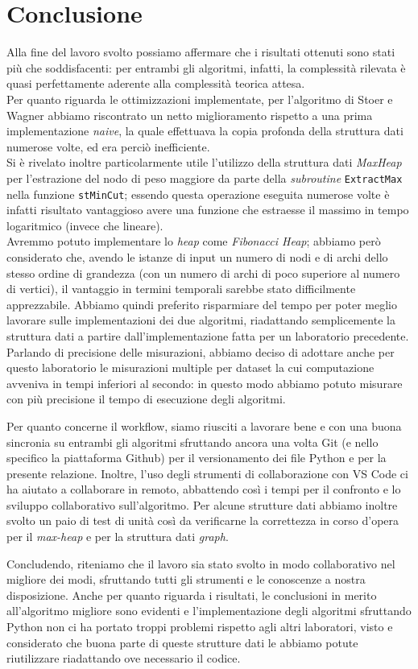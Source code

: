 \section{Conclusione}

Alla fine del lavoro svolto possiamo affermare che i risultati ottenuti sono stati più che soddisfacenti: per entrambi gli algoritmi, infatti, la complessità rilevata è quasi perfettamente aderente alla complessità teorica attesa. \\
Per quanto riguarda le ottimizzazioni implementate, per l'algoritmo di Stoer e Wagner abbiamo riscontrato un netto miglioramento rispetto a una prima implementazione \textit{naive}, la quale effettuava la copia profonda della struttura dati numerose volte, ed era perciò inefficiente.\\
Si è rivelato inoltre particolarmente utile l'utilizzo della struttura dati \textit{MaxHeap} per l'estrazione del nodo di peso maggiore da parte della \textit{subroutine} \texttt{ExtractMax} nella funzione \texttt{stMinCut}; essendo questa operazione eseguita numerose volte è infatti risultato vantaggioso avere una funzione che estraesse il massimo in tempo logaritmico (invece che lineare). \\
Avremmo potuto implementare lo \textit{heap} come \textit{Fibonacci Heap}; abbiamo però considerato che, avendo le istanze di input un numero di nodi e di archi dello stesso ordine di grandezza (con un numero di archi di poco superiore al numero di vertici), il vantaggio in termini temporali sarebbe stato difficilmente apprezzabile. Abbiamo quindi preferito risparmiare del tempo per poter meglio lavorare sulle implementazioni dei due algoritmi, riadattando semplicemente la struttura dati a partire dall'implementazione fatta per un laboratorio precedente.\\
Parlando di precisione delle misurazioni, abbiamo deciso di adottare anche per questo laboratorio le misurazioni multiple per dataset la cui computazione avveniva in tempi inferiori al secondo: in questo modo abbiamo potuto misurare con più precisione il tempo di esecuzione degli algoritmi.

Per quanto concerne il workflow, siamo riusciti a lavorare bene e con una buona sincronia su entrambi gli algoritmi sfruttando ancora una volta Git (e nello specifico la piattaforma Github) per il versionamento dei file Python e per la presente relazione. Inoltre, l'uso degli strumenti di collaborazione con VS Code ci ha aiutato a collaborare in remoto, abbattendo così i tempi per il confronto e lo sviluppo collaborativo sull'algoritmo. Per alcune strutture dati abbiamo inoltre svolto un paio di test di unità così da verificarne la correttezza in corso d'opera per il \textit{max-heap} e per la struttura dati \textit{graph}. 

Concludendo, riteniamo che il lavoro sia stato svolto in modo collaborativo nel migliore dei modi, sfruttando tutti gli strumenti e le conoscenze a nostra disposizione. Anche per quanto riguarda i risultati, le conclusioni in merito all'algoritmo migliore sono evidenti e l'implementazione degli algoritmi sfruttando Python non ci ha portato troppi problemi rispetto agli altri laboratori, visto e considerato che buona parte di queste strutture dati le abbiamo potute riutilizzare riadattando ove necessario il codice. 

